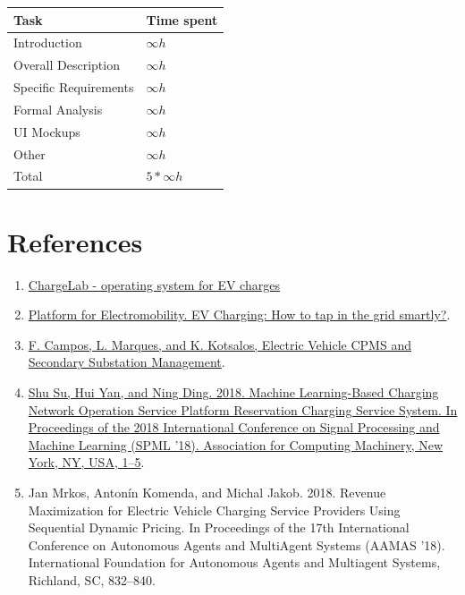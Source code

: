 \documentclass[11pt]{article}
\begin{document}
\begin{tabular}{|l|l|}
    \hline
    \textbf{Task} & \textbf{Time spent} \\
    \hline
    Introduction & $\infty h$ \\
    \hline
    Overall Description & $\infty h$ \\
    \hline
    Specific Requirements & $\infty h$ \\
    \hline
    Formal Analysis & $\infty h$ \\
    \hline
    UI Mockups & $\infty h$ \\
    \hline
    Other & $\infty h$ \\
    \hline
    \hline
    Total & $5*\infty h$ \\
    \hline
\end{tabular}

\newpage

\section{References}
\label{section:references}

\begin{enumerate}
    \item \href{https://www.chargelab.co/}{ChargeLab - operating system for EV charges}
    \item \href{https://www.platformelectromobility.eu/2022/05/17/ev-charging-how-to-tap-in-the-grid-smartly/}{Platform for Electromobility. EV Charging: How to tap in the grid smartly?}.
    \item \href{https://mobilityintegrationsymposium.org/wp-content/uploads/sites/10/2018/11/4A_3_Emob18_024_paper_Filipe_Campos.pdf}{F. Campos, L. Marques, and K. Kotsalos, Electric Vehicle CPMS and Secondary Substation Management}.
    \item \href{https://doi.org/10.1145/3297067.3297078}{Shu Su, Hui Yan, and Ning Ding. 2018. Machine Learning-Based Charging Network Operation Service Platform Reservation Charging Service System. In Proceedings of the 2018 International Conference on Signal Processing and Machine Learning (SPML '18). Association for Computing Machinery, New York, NY, USA, 1–5}.
    \item Jan Mrkos, Antonín Komenda, and Michal Jakob. 2018. Revenue Maximization for Electric Vehicle Charging Service Providers Using Sequential Dynamic Pricing. In Proceedings of the 17th International Conference on Autonomous Agents and MultiAgent Systems (AAMAS '18). International Foundation for Autonomous Agents and Multiagent Systems, Richland, SC, 832–840.
\end{enumerate}
\end{document}

